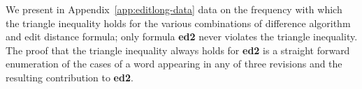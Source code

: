 We present in Appendix~\ref{app:editlong-data} data on the frequency
with which the triangle inequality holds for the various combinations
of difference algorithm and edit distance formula; only formula \textbf{ed2}
never violates the triangle inequality.
The proof that the triangle inequality always holds for \textbf{ed2} is
a straight forward enumeration of the cases of a word appearing in any
of three revisions and the resulting contribution to \textbf{ed2}.

